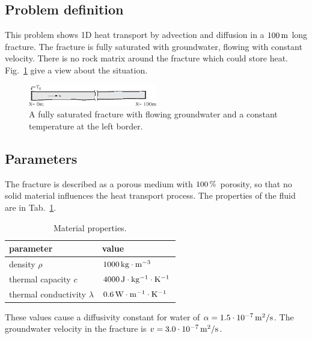 \subsection{Problem definition}

This problem shows 1D heat transport by advection and diffusion in a $\unit[100]{m}$ long fracture. The fracture is fully saturated with groundwater, flowing with constant velocity. There is no rock matrix around the fracture which could store heat. Fig.~\ref{fig-addiff1} give a view about the situation.
\begin{figure}[h]
\centering
\includegraphics[width=0.5\textwidth]{T/figures/Ad-Diff-Problem-def.eps}
\caption{\label{fig-addiff1}A fully saturated fracture with flowing groundwater and a constant temperature at the left border.}
\end{figure}

\subsection{Parameters}

The fracture is described as a porous medium with $\unit[100]{\%}$ porosity, so that no solid material influences the heat transport process. The properties of the fluid are in Tab.~\ref{tab-addiff}.
\begin{table}[h]
\caption{\label{tab-addiff}Material properties.}
\begin{center}
\begin{tabular}{ll}
\toprule
parameter 						& value \\
\midrule
density $\rho$ 					& $\unit[1000]{kg \cdot m^{-3}}$ \\			
thermal capacity $c$			& $\unit[4000]{J \cdot kg^{-1} \cdot K^{-1}}$ \\
thermal conductivity $\lambda$ 	& $\unit[0.6]{W \cdot m^{-1} \cdot K^{-1}}$ \\
\bottomrule
\end{tabular}
\end{center}
\end{table}
These values cause a diffusivity constant for water of $\alpha=\unit[1.5 \cdot 10^{-7}]{m^2/s}$. The groundwater velocity in the fracture is $v=\unit[3.0 \cdot 10^{-7}]{m^2/s}$.

